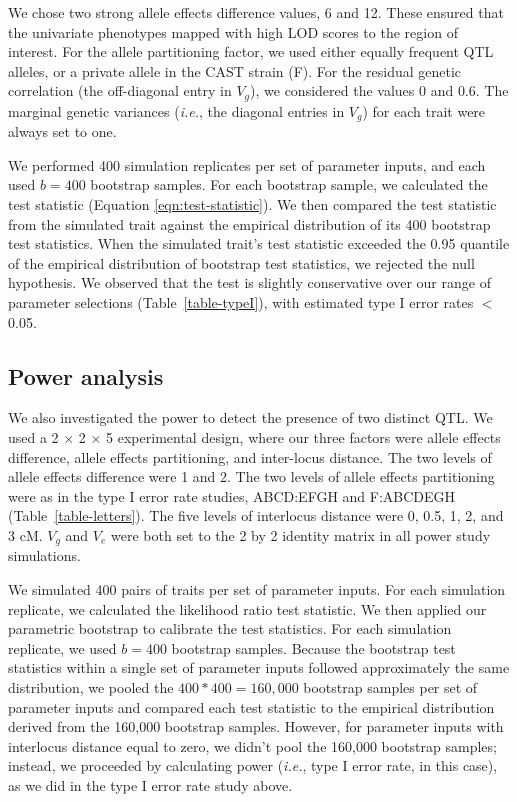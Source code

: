 \documentclass[oneside]{book}\usepackage[]{graphicx}\usepackage[]{color}
\begin{document}
We chose two strong allele effects difference values, 6 and 12. These
ensured that the univariate phenotypes mapped with high LOD scores to
the region of interest. For the allele partitioning factor, we used
either equally frequent QTL alleles, or a private allele in the CAST
strain (F). For the residual genetic correlation (the off-diagonal
entry in $V_g$), we considered the values 0 and 0.6. The marginal
genetic variances (\textit{i.e.}, the diagonal entries in $V_g$) for
each trait were always set to one.

We performed 400 simulation replicates per set of parameter inputs,
and each used $b = 400$ bootstrap samples. For each bootstrap sample, we calculated the
test statistic (Equation \ref{eqn:test-statistic}). We then compared
the test statistic from the simulated trait against the empirical
distribution of its 400 bootstrap test statistics. When the simulated
trait's test statistic exceeded the 0.95 quantile of the empirical
distribution of bootstrap test statistics, we rejected the null
hypothesis. We observed that the test is slightly conservative over
our range of parameter selections (Table~\ref{table-typeI}), with
estimated type I error rates $<$ 0.05.


\subsection{Power analysis}

We also investigated the power to detect the presence of two
distinct QTL. We used a 2 $\times$ 2 $\times$ 5 experimental design, where our
three factors were allele effects difference, allele effects
partitioning, and inter-locus distance. The two levels of allele
effects difference were 1 and 2. The two levels of allele effects
partitioning were as in the type I error rate studies, ABCD:EFGH and
F:ABCDEGH (Table~\ref{table-letters}). The five levels of interlocus
distance were 0, 0.5, 1, 2, and 3 cM. $V_g$ and $V_e$ were both set to
the 2 by 2 identity matrix in all power study simulations.

We simulated 400 pairs of traits per set of parameter inputs. For
each simulation replicate, we calculated the likelihood ratio test
statistic. We then applied our parametric bootstrap to calibrate the
test statistics. For each simulation replicate, we used $b = 400$ bootstrap
samples. Because the bootstrap test statistics within a single set of
parameter inputs followed approximately the same distribution, we
pooled the $400 * 400 = 160,000$ bootstrap samples per set of
parameter inputs and compared each test statistic to the empirical
distribution derived from the 160,000 bootstrap samples. However, for
parameter inputs with interlocus distance equal to zero, we didn't
pool the 160,000 bootstrap samples; instead, we proceeded by
calculating power (\textit{i.e.}, type I error rate, in this case), as we did in the
type I error rate study above.
\end{document}
